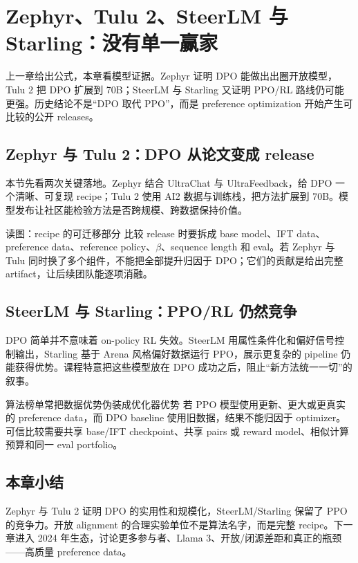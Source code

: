 \section{Zephyr、Tulu 2、SteerLM 与 Starling：没有单一赢家}

上一章给出公式，本章看模型证据。Zephyr 证明 DPO 能做出出圈开放模型，Tulu 2 把 DPO 扩展到 70B；SteerLM 与 Starling 又证明 PPO/RL 路线仍可能更强。历史结论不是“DPO 取代 PPO”，而是 preference optimization 开始产生可比较的公开 releases。

\subsection{Zephyr 与 Tulu 2：DPO 从论文变成 release}

本节先看两次关键落地。Zephyr 结合 UltraChat 与 UltraFeedback，给 DPO 一个清晰、可复现 recipe；Tulu 2 使用 AI2 数据与训练栈，把方法扩展到 70B。模型发布让社区能检验方法是否跨规模、跨数据保持价值。



\begin{knowledgebox}{读图：recipe 的可迁移部分}
比较 release 时要拆成 base model、IFT data、preference data、reference policy、$\beta$、sequence length 和 eval。若 Zephyr 与 Tulu 同时换了多个组件，不能把全部提升归因于 DPO；它们的贡献是给出完整 artifact，让后续团队能逐项消融。
\end{knowledgebox}


\subsection{SteerLM 与 Starling：PPO/RL 仍然竞争}

DPO 简单并不意味着 on-policy RL 失效。SteerLM 用属性条件化和偏好信号控制输出，Starling 基于 Arena 风格偏好数据运行 PPO，展示更复杂的 pipeline 仍能获得优势。课程特意把这些模型放在 DPO 成功之后，阻止“新方法统一一切”的叙事。


\begin{warningbox}{算法榜单常把数据优势伪装成优化器优势}
若 PPO 模型使用更新、更大或更真实的 preference data，而 DPO baseline 使用旧数据，结果不能归因于 optimizer。可信比较需要共享 base/IFT checkpoint、共享 pairs 或 reward model、相似计算预算和同一 eval portfolio。
\end{warningbox}


\subsection{本章小结}

Zephyr 与 Tulu 2 证明 DPO 的实用性和规模化，SteerLM/Starling 保留了 PPO 的竞争力。开放 alignment 的合理实验单位不是算法名字，而是完整 recipe。下一章进入 2024 年生态，讨论更多参与者、Llama 3、开放/闭源差距和真正的瓶颈——高质量 preference data。

